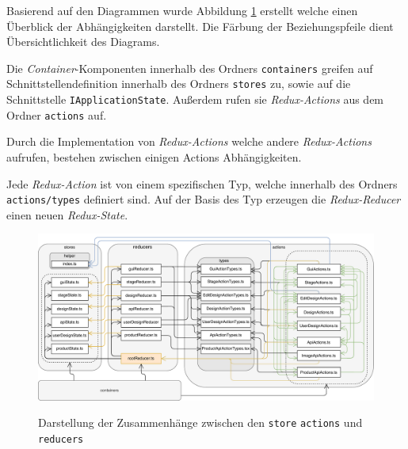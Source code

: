 Basierend auf den Diagrammen wurde Abbildung \ref{fig:Redux} erstellt welche einen Überblick der Abhängigkeiten darstellt. Die Färbung der Beziehungspfeile dient Übersichtlichkeit des Diagrams.

Die \emph{Container}-Komponenten innerhalb des Ordners \lstinline|containers| greifen auf Schnittstellendefinition innerhalb des Ordners \lstinline|stores| zu, sowie auf die Schnittstelle \lstinline|IApplicationState|. 
Außerdem rufen sie \emph{Redux-Actions} aus dem Ordner \lstinline|actions| auf.

Durch die Implementation von \emph{Redux-Actions} welche andere \emph{Redux-Actions} aufrufen, bestehen zwischen einigen  Actions Abhängigkeiten.  

Jede \emph{Redux-Action} ist von einem spezifischen Typ, welche innerhalb des Ordners \lstinline|actions/types| definiert sind. Auf der Basis des Typ erzeugen die \emph{Redux-Reducer} einen neuen \emph{Redux-State}.

\begin{figure}[H]
    \centering
    \caption{Darstellung der Zusammenhänge zwischen den \lstinline|store| \lstinline|actions| und \lstinline|reducers|}
    \includegraphics[width=1\textwidth]{diagrams/Ist-Architektur/Redux.pdf}
    \label{fig:Redux}
\end{figure}



